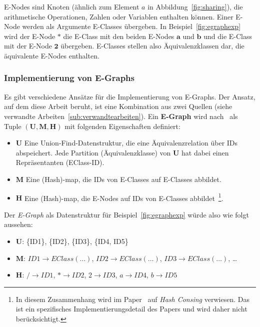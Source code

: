 E-Nodes sind Knoten (ähnlich zum Element $a$ in Abbildung~\ref{fig:sharing}), die arithmetische Operationen, Zahlen oder Variablen enthalten können.
Einer E-Node werden als Argumente E-Classes übergeben. In Beispiel~\ref{fig:egraphexp} wird der E-Node $\mathbf{*}$ die 
E-Class mit den beiden E-Nodes $\mathbf{a}$ und $\mathbf{b}$ und die E-Class mit der E-Node $\mathbf{2}$ übergeben. 
E-Classes stellen also Äquivalenzklassen dar, die äquivalente E-Nodes enthalten.

\subsubsection{Implementierung von E-Graphs}

Es gibt verschiedene Ansätze für die Implementierung von E-Graphs. Der Ansatz, auf dem diese Arbeit beruht, ist eine Kombination aus zwei Quellen 
(siehe verwandte Arbeiten~\ref{sub:verwandtearbeiten}).
Ein \textbf{E-Graph} wird nach~\cite{2021-egg} als Tuple $(\mathbf{U}, \mathbf{M}, \mathbf{H})$ mit folgenden Eigenschaften definiert:

\begin{itemize}
  \item $\mathbf{U}$ Eine Union-Find-Datenstruktur, die eine Äquivalenzrelation über IDs abspeichert. Jede Partition (Äquivalenzklasse) von $\mathbf{U}$ hat dabei einen Repräsentanten (EClass-ID).
  \item $\mathbf{M}$ Eine (Hash)-map, die IDs von E-Classes auf E-Classes abbildet. 
  \item $\mathbf{H}$ Eine (Hash)-map, die E-Nodes auf IDs von E-Classes abbildet~\footnote{In diesem Zusammenhang wird im Paper~\cite{2021-egg} auf \textit{Hash Consing} verwiesen. Das ist ein spezifisches Implementierungsdetail des Papers und wird daher nicht berücksichtigt.}.
\end{itemize}

Der \textit{E-Graph} als Datenstruktur für Beispiel~\ref{fig:egraphexp} würde also wie folgt aussehen:

\begin{itemize}
  \item $\mathbf{U}$: \{ID1\}, \{ID2\}, \{ID3\}, \{ID4, ID5\} 
  \item $\mathbf{M}$: $ID1 \rightarrow EClass(\ldots)$, $ID2 \rightarrow EClass(\ldots)$, $ID3 \rightarrow EClass(\ldots)$, \ldots 
  \item $\mathbf{H}$: $/ \rightarrow ID1$, $* \rightarrow ID2$, $2 \rightarrow ID3$, $a \rightarrow ID4$, $b \rightarrow ID5$
\end{itemize}

